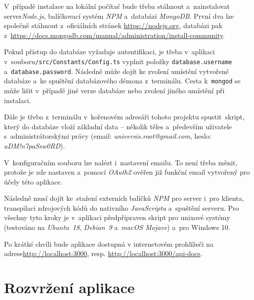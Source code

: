\documentclass[a4paper,12pt]{article}
\def\code#1{\texttt{#1}}
\begin{document}
V~případě instalace na lokální počítač bude třeba stáhnout a~nainstalovat server\textit{Node.js}, balíčkovací systém \textit{NPM} a~databázi \textit{MongoDB}. První dva lze společně stáhnout z~oficiálních stránek \url{https://nodejs.org}, databázi pak z~\url{https://docs.mongodb.com/manual/administration/install-community}.

Pokud přístup do databáze vyžaduje autentifikaci, je třeba v~aplikaci v~souboru\break\code{/src/Constants/Config.ts} vyplnit položky \code{database.username} a~\code{database.password}. Následně může dojít ke zvolení umístění vytvořené databáze a~ke spuštění databázového démona z~terminálu. Cesta k~\code{mongod} se může lišit v~případě jiné verze databáze nebo zvolení jiného umístění při instalaci.



Dále je třeba z~terminálu v~kořenovém adresáři tohoto projektu spustit~skript, který do databáze vloží základní data -- několik těles a~především uživatele s~administrátorskými právy (email: \textit{universis.root@gmail.com}, heslo: \textit{aDM!n7paSsw0RD}).



V~konfiguračním souboru lze nalézt i~nastavení emailu. To není třeba měnit, protože je zde nastaven a~pomocí \textit{OAuth2} ověřen již funkční email vytvořený pro účely této aplikace.

Následně musí dojít ke~stažení externích balíčků \textit{NPM} pro server i~pro klienta, transpilaci zdrojových kódů do nativního \textit{JavaScriptu} a~spuštění serveru. Pro všechny tyto kroky je v~aplikaci předpřipraven skript pro unixové systémy (testováno na \textit{Ubuntu~18}, \textit{Debian~9} a~\textit{macOS Mojave}) a~pro Windows 10.



Po krátké chvíli bude aplikace dostupná v internetovém prohlížeči na adrese\break\url{http://localhost:3000}, resp. \url{http://localhost:3000/api-docs}.

\section{Rozvržení aplikace}
\end{document}
